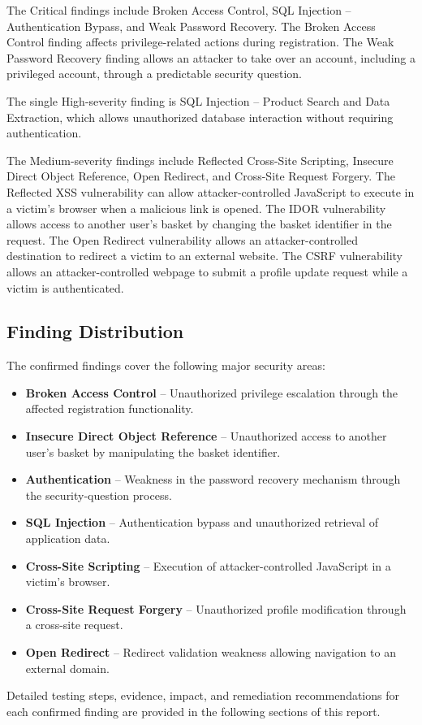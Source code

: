 The Critical findings include Broken Access Control, SQL Injection --
Authentication Bypass, and Weak Password Recovery. The Broken Access
Control finding affects privilege-related actions during registration.
The Weak Password Recovery finding allows an attacker to take over an
account, including a privileged account, through a predictable
security question.

The single High-severity finding is SQL Injection -- Product Search
and Data Extraction, which allows unauthorized database interaction
without requiring authentication.

The Medium-severity findings include Reflected Cross-Site Scripting,
Insecure Direct Object Reference, Open Redirect, and Cross-Site
Request Forgery. The Reflected XSS vulnerability can allow
attacker-controlled JavaScript to execute in a victim's browser when a
malicious link is opened. The IDOR vulnerability allows access to
another user's basket by changing the basket identifier in the
request. The Open Redirect vulnerability allows an attacker-controlled
destination to redirect a victim to an external website. The CSRF
vulnerability allows an attacker-controlled webpage to submit a
profile update request while a victim is authenticated.

\subsection*{Finding Distribution}

The confirmed findings cover the following major security areas:

\begin{itemize}

    \item \textbf{Broken Access Control} -- Unauthorized privilege
    escalation through the affected registration functionality.

    \item \textbf{Insecure Direct Object Reference} -- Unauthorized
    access to another user's basket by manipulating the basket
    identifier.

    \item \textbf{Authentication} -- Weakness in the password recovery
    mechanism through the security-question process.

    \item \textbf{SQL Injection} -- Authentication bypass and
    unauthorized retrieval of application data.

    \item \textbf{Cross-Site Scripting} -- Execution of
    attacker-controlled JavaScript in a victim's browser.

    \item \textbf{Cross-Site Request Forgery} -- Unauthorized profile
    modification through a cross-site request.

    \item \textbf{Open Redirect} -- Redirect validation weakness
    allowing navigation to an external domain.

\end{itemize}

Detailed testing steps, evidence, impact, and remediation
recommendations for each confirmed finding are provided in the
following sections of this report.